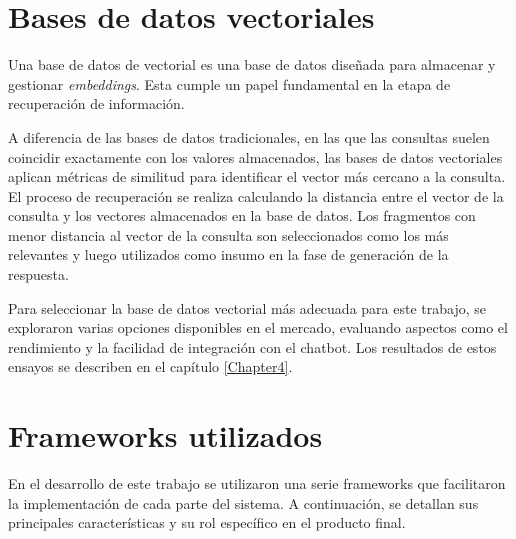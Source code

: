 \section{Bases de datos vectoriales}

Una base de datos de vectorial \citep{article:vector-db} es una base de datos diseñada para almacenar y gestionar \textit{embeddings}. Esta
cumple un papel fundamental en la etapa de recuperación de información.

A diferencia de las bases de datos tradicionales, en las que las consultas suelen coincidir exactamente con los valores almacenados, 
las bases de datos vectoriales aplican métricas de similitud para identificar el vector más cercano a la consulta. 
El proceso de recuperación se realiza calculando la distancia entre 
el vector de la consulta y los vectores almacenados en la base de datos. Los fragmentos con menor distancia al vector 
de la consulta son seleccionados como los más relevantes y luego utilizados como insumo en la fase de generación de la respuesta. 

Para seleccionar la base de datos vectorial más adecuada para este trabajo, se exploraron varias opciones 
disponibles en el mercado, evaluando aspectos como el rendimiento y la facilidad de integración con el chatbot. 
Los resultados de estos ensayos se describen en el capítulo \ref{Chapter4}.

\section{Frameworks utilizados}

En el desarrollo de este trabajo se utilizaron una serie frameworks que facilitaron la implementación de 
cada parte del sistema. A continuación, se detallan sus principales características y su rol específico en el producto final.

